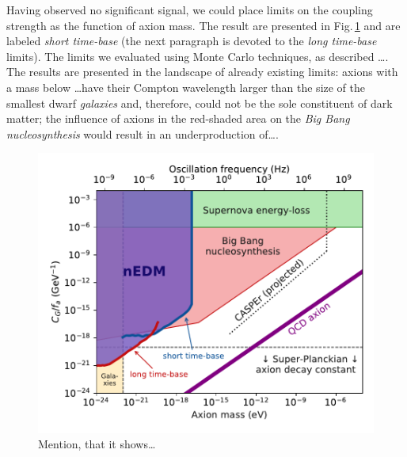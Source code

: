 Having observed no significant signal, we could place limits on the coupling strength as the function of axion mass.
The result are presented in Fig.\,\ref{fig:axions_limits_coupling} and are labeled \emph{short time-base} (the next paragraph is devoted to the \emph{long time-base} limits).
The limits we evaluated using Monte Carlo techniques, as described \ldots.
The results are presented in the landscape of already existing limits: axions with a mass below \ldots have their Compton wavelength larger than the size of the smallest dwarf \emph{galaxies} and, therefore, could not be the sole constituent of dark matter; the influence of axions in the red-shaded area on the \emph{Big Bang nucleosynthesis} would result in an underproduction of\ldots .

\begin{figure}
  \centering
  \includegraphics[width=0.9\linewidth]{gfx/axions/psi_ill_axion_limits_v7.pdf}
  \caption{Mention, that it shows\ldots}
  \label{fig:axions_limits_coupling}
\end{figure}

